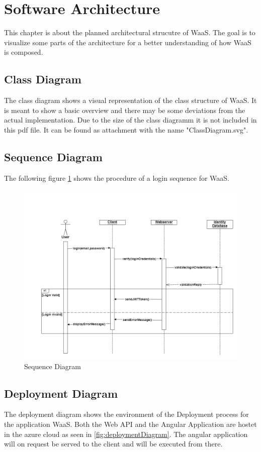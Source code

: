\documentclass[titlepage, 12pt]{article}
\begin{document}
\section{Software Architecture}
This chapter is about the planned architectural strucutre of WaaS. The goal is to visualize some parts of the architecture for a better understanding of how WaaS is composed.

\subsection{Class Diagram}
The class diagram shows a visual representation of the class structure of WaaS. It is meant to show a basic overview and there may be some deviations from the actual implementation. Due to the size of the class diagramm it is not included in this pdf file. It can be found as attachment with the name "ClassDiagram.svg".

\subsection{Sequence Diagram}
The following figure \ref{fig:sequenceDiagram} shows the procedure of a login sequence for WaaS.

\begin{figure}[H]
  \includegraphics[width=0.95\linewidth]{SequenceDiagram.png}
  \caption{Sequence Diagram}
  \label{fig:sequenceDiagram}
\end{figure}

\subsection{Deployment Diagram}
The deployment diagram shows the environment of the Deployment process for the application WaaS. Both the Web API and the Angular Application are hostet in the azure cloud as seen in \ref{fig:deploymentDiagram}. The angular application will on request be served to the client and will be executed from there.
\end{document}
